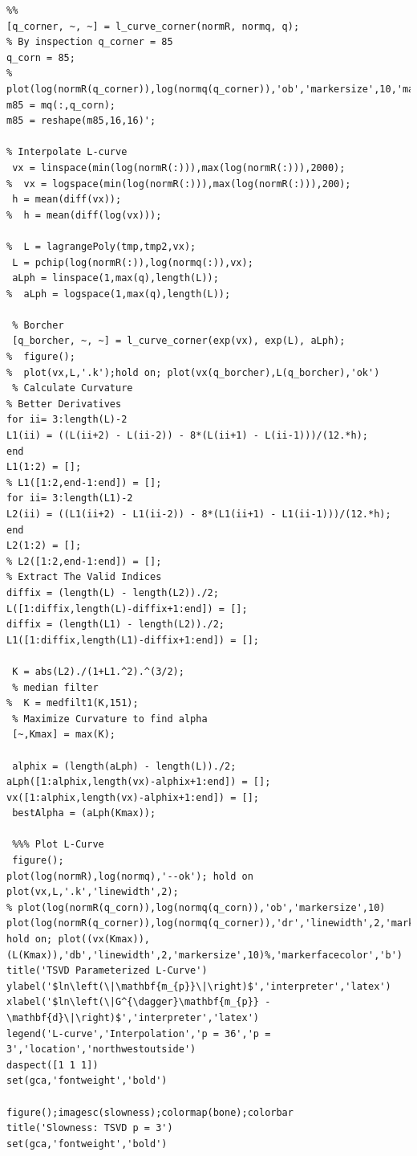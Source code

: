 \documentclass{article}
\begin{document}
\begin{verbatim}
%%
[q_corner, ~, ~] = l_curve_corner(normR, normq, q);
% By inspection q_corner = 85
q_corn = 85;
% plot(log(normR(q_corner)),log(normq(q_corner)),'ob','markersize',10,'markerfacecolor','b')
m85 = mq(:,q_corn);
m85 = reshape(m85,16,16)';

% Interpolate L-curve
 vx = linspace(min(log(normR(:))),max(log(normR(:))),2000);
%  vx = logspace(min(log(normR(:))),max(log(normR(:))),200);
 h = mean(diff(vx));
%  h = mean(diff(log(vx)));

%  L = lagrangePoly(tmp,tmp2,vx);
 L = pchip(log(normR(:)),log(normq(:)),vx);
 aLph = linspace(1,max(q),length(L));
%  aLph = logspace(1,max(q),length(L));

 % Borcher
 [q_borcher, ~, ~] = l_curve_corner(exp(vx), exp(L), aLph);
%  figure();
%  plot(vx,L,'.k');hold on; plot(vx(q_borcher),L(q_borcher),'ok')
 % Calculate Curvature
% Better Derivatives
for ii= 3:length(L)-2
L1(ii) = ((L(ii+2) - L(ii-2)) - 8*(L(ii+1) - L(ii-1)))/(12.*h);
end
L1(1:2) = [];
% L1([1:2,end-1:end]) = [];
for ii= 3:length(L1)-2
L2(ii) = ((L1(ii+2) - L1(ii-2)) - 8*(L1(ii+1) - L1(ii-1)))/(12.*h);
end
L2(1:2) = [];
% L2([1:2,end-1:end]) = [];
% Extract The Valid Indices
diffix = (length(L) - length(L2))./2;
L([1:diffix,length(L)-diffix+1:end]) = [];
diffix = (length(L1) - length(L2))./2;
L1([1:diffix,length(L1)-diffix+1:end]) = [];

 K = abs(L2)./(1+L1.^2).^(3/2);
 % median filter
%  K = medfilt1(K,151);
 % Maximize Curvature to find alpha
 [~,Kmax] = max(K);
 
 alphix = (length(aLph) - length(L))./2;
aLph([1:alphix,length(vx)-alphix+1:end]) = [];
vx([1:alphix,length(vx)-alphix+1:end]) = [];
 bestAlpha = (aLph(Kmax));
 
 %%% Plot L-Curve
 figure();
plot(log(normR),log(normq),'--ok'); hold on
plot(vx,L,'.k','linewidth',2);
% plot(log(normR(q_corn)),log(normq(q_corn)),'ob','markersize',10)
plot(log(normR(q_corner)),log(normq(q_corner)),'dr','linewidth',2,'markersize',10)%,'markerfacecolor','r')
hold on; plot((vx(Kmax)),(L(Kmax)),'db','linewidth',2,'markersize',10)%,'markerfacecolor','b')
title('TSVD Parameterized L-Curve')
ylabel('$ln\left(\|\mathbf{m_{p}}\|\right)$','interpreter','latex')
xlabel('$ln\left(\|G^{\dagger}\mathbf{m_{p}} - \mathbf{d}\|\right)$','interpreter','latex')
legend('L-curve','Interpolation','p = 36','p = 3','location','northwestoutside')
daspect([1 1 1])
set(gca,'fontweight','bold')

figure();imagesc(slowness);colormap(bone);colorbar
title('Slowness: TSVD p = 3')
set(gca,'fontweight','bold')


\end{verbatim}
\end{document}
